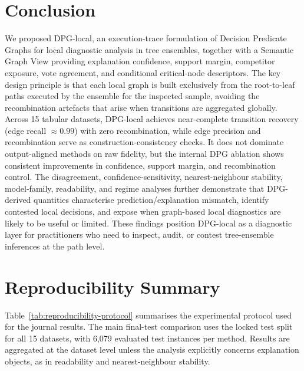 \documentclass[runningheads]{llncs}
\begin{document}
\section{Conclusion}

We proposed DPG-local, an execution-trace formulation of Decision Predicate Graphs for local diagnostic analysis in tree ensembles, together with a Semantic Graph View providing explanation confidence, support margin, competitor exposure, vote agreement, and conditional critical-node descriptors. The key design principle is that each local graph is built exclusively from the root-to-leaf paths executed by the ensemble for the inspected sample, avoiding the recombination artefacts that arise when transitions are aggregated globally.
Across 15 tabular datasets, DPG-local achieves near-complete transition recovery (edge recall $\approx0.99$) with zero recombination, while edge precision and recombination serve as construction-consistency checks. It does not dominate output-aligned methods on raw fidelity, but the internal DPG ablation shows consistent improvements in confidence, support margin, and recombination control. The disagreement, confidence-sensitivity, nearest-neighbour stability, model-family, readability, and regime analyses further demonstrate that DPG-derived quantities characterise prediction/explanation mismatch, identify contested local decisions, and expose when graph-based local diagnostics are likely to be useful or limited. These findings position DPG-local as a diagnostic layer for practitioners who need to inspect, audit, or contest tree-ensemble inferences at the path level.

\appendix
\section{Reproducibility Summary}
\label{app:reproducibility}

Table~\ref{tab:reproducibility-protocol} summarises the experimental protocol used for the journal results. The main final-test comparison uses the locked test split for all 15 datasets, with 6,079 evaluated test instances per method. Results are aggregated at the dataset level unless the analysis explicitly concerns explanation objects, as in readability and nearest-neighbour stability.
\end{document}
